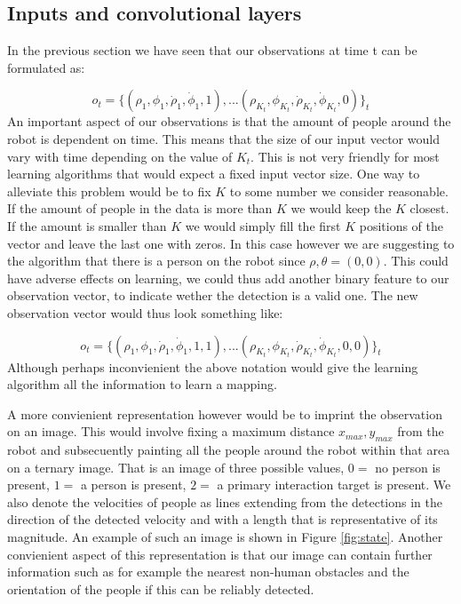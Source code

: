 \documentclass[letterpaper, 10 pt, conference]{ieeeconf}
\begin{document}
\subsection{Inputs and convolutional layers \label{subsec:meth_inp}}
In the previous section we have seen that our observations at time t can be formulated as:

\begin{equation}
 	o_t = \{(\rho_1,\phi_1,\dot{\rho}_1,\dot{\phi}_1,1),... (\rho_{K_t},\phi_{K_t},\dot{\rho}_{K_t},\dot{\phi}_{K_t},0)\}_t
\end{equation}
An important aspect of our observations is that the amount of people around the robot is dependent on time. This means that the size of our input vector would vary with time depending on the value of $K_t$. This is not very friendly for most learning algorithms that would expect a fixed input vector size. One way to alleviate this problem would be to fix $K$ to some number we consider reasonable. If the amount of people in the data is more than $K$ we would keep the $K$ closest. If the amount is smaller than $K$ we would simply fill the first $K$ positions of the vector and leave the last one with zeros. In this case however we are suggesting to the algorithm that there is a person on the robot since $\rho,\theta = (0,0)$. This could have adverse effects on learning, we could thus add another binary feature to our observation vector, to indicate wether the detection is a valid one. The new observation vector would thus look something like:

\begin{equation}
 	o_t = \{(\rho_1,\phi_1,\dot{\rho}_1,\dot{\phi}_1,1,1),... (\rho_{K_t},\phi_{K_t},\dot{\rho}_{K_t},\dot{\phi}_{K_t},0,0)\}_t
\end{equation}
Although perhaps inconvienient the above notation would give the learning algorithm all the information to learn a mapping. 

A more convienient representation however would be to imprint the observation on an image. This would involve fixing a maximum distance $x_{max},y_{max}$ from the robot and subsecuently painting all the people around the robot within that area on a ternary image. That is an image of three possible values, $0=$ no person is present, $1=$ a person is present, $2=$ a primary interaction target is present. We also denote the velocities of people as lines extending from the detections in the direction of the detected velocity and with a length that is representative of its magnitude. An example of such an image is shown in Figure \ref{fig:state}. Another convienient aspect of this representation is that our image can contain further information such as for example the nearest non-human obstacles and the orientation of the people if this can be reliably detected. 
\end{document}
